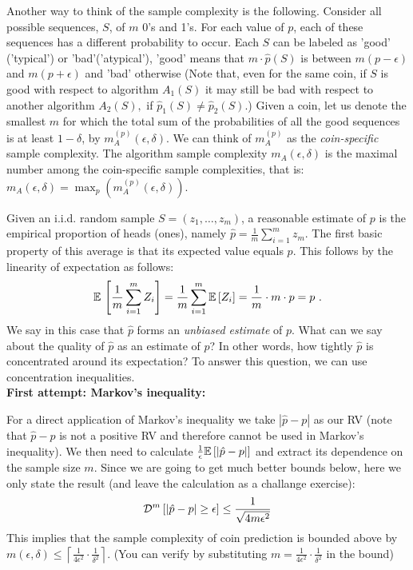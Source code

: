 Another way to think of the sample complexity is the following. Consider all possible sequences, $S$, of $m$ 0's and 1's. For each value of $p$, each of these sequences has a different probability to occur. Each $S$ can be labeled as 'good' ('typical') or 'bad'('atypical'), 'good' means that $m \cdot \hat{p}(S)$ is between $m(p-\epsilon)$ and $m(p+\epsilon)$ and 'bad' otherwise (Note that,  even for the same coin,  if  $S$ is good with respect to algorithm $A_1(S)$ it may still be bad with respect to another algorithm $A_2(S),$  if $\hat{p}_1(S)\ne \hat{p}_2(S)$.) Given a coin, let us denote the smallest $m$ for which the  total sum of the probabilities of all the good sequences is at least $1-\delta$, by $m_A^{(p)}(\epsilon,\delta)$. We can think of $m_A^{(p)}$ as the \emph{coin-specific} sample complexity. The algorithm sample complexity $m_A(\epsilon,\delta)$ is the maximal number among the coin-specific sample complexities, that is: $m_A(\epsilon,\delta) = \max_{p}(m_A^{(p)}(\epsilon,\delta))$.


Given an i.i.d. random sample $S=(z_1, \ldots, z_m)$, a reasonable
estimate of $p$ is the empirical proportion of heads (ones), namely
$\hat{p}=\frac{1}{m} \sum_{i=1} ^m z_m$. The first basic property of
this average is that its expected value equals $p$. This follows by
the linearity of expectation as follows:
\[
\mathbb{E}\, \left [\frac{1}{m} \sum_{i=1} ^m Z_i \right] = \frac{1}{m} \sum_{i=1} ^m
\mathbb{E}\,[Z_i] = \frac{1}{m} \cdot m \cdot p = p~.
\]
We say in this case that $\hat{p}$ forms an \emph{unbiased estimate}
of $p$. What can we say about the quality of $\hat{p}$ as an estimate
of $p$? In other words, how tightly $\hat{p}$ is concentrated around
its expectation? To answer this question, we can use concentration inequalities.\\

\noindent \textbf{First attempt: Markov's inequality: }

For a direct application of Markov's inequality we take  $|\hat{p}-p|$ as our RV  (note that $\hat{p}-p$ is not a positive RV and therefore cannot be used in Markov's inequality). We then need to calculate $\frac{1}{\epsilon}\mathbb{E}\,[|\hat{p}-p|]$ and extract its dependence on the sample size $m$.
Since we are going to get much better bounds below, here we only state the result (and leave the calculation as a challange exercise):
$$
\mathcal{D}^m \left[|\hat{p}-p| \geq \epsilon \right]  \le \frac{1}{\sqrt{4m\epsilon^2}}
$$
This implies that the sample complexity of coin prediction is bounded above by
$m(\epsilon,\delta) \le \left \lceil \frac{1}{4\epsilon^2} \cdot
  \frac{1}{\delta^2} \right \rceil$.
  (You can verify by substituting $m=\frac{1}{4\epsilon^2}\cdot
  \frac{1}{\delta^2}$ in the bound)

